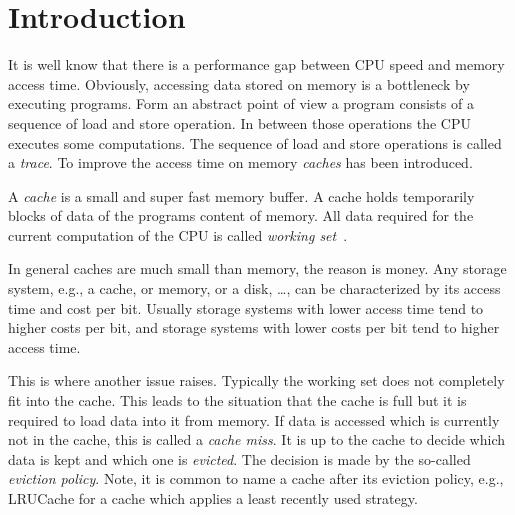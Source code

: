 \documentclass[onecolumn, openany, master, english, seal, signatures]{dbrgrptt}
\begin{document}

%
\thesisdate{\today}%
%
%

\frontmatter%

%

\mainmatter%

\chapter{Introduction}\label{cha:introduction}
\torevise
It is well know that there is a performance gap between CPU speed and memory access time. Obviously, accessing data stored on memory is a bottleneck by executing programs. Form an abstract point of view a program consists of a sequence of load and store operation. In between those operations the CPU executes some computations. The sequence of load and store operations is called a \emph{trace}. To improve the access time on memory \emph{caches} has been introduced.

A \emph{cache} is a small and super fast memory buffer. A cache holds temporarily blocks of data of the programs content of memory. All data required for the current computation of the CPU is called \emph{working set}~\cite{denning1968working}.

In general caches are much small than memory, the reason is money. Any storage system, e.g., a cache, or memory, or a disk, \dots, can be characterized by its access time and cost per bit. Usually storage systems with lower access time tend to higher costs per bit, and storage systems with lower costs per bit tend to higher access time.

This is where another issue raises. Typically the working set does not completely fit into the cache. This leads to the situation that the cache is full but it is required to load data into it from memory. If data is accessed which is currently not in the cache, this is called a \emph{cache miss}. It is up to the cache to decide which data is kept and which one is \emph{evicted}. The decision is made by the so-called \emph{eviction policy}. Note, it is common to name a cache after its eviction policy, e.g., LRUCache for a cache which applies a least recently used strategy.
\end{document}
